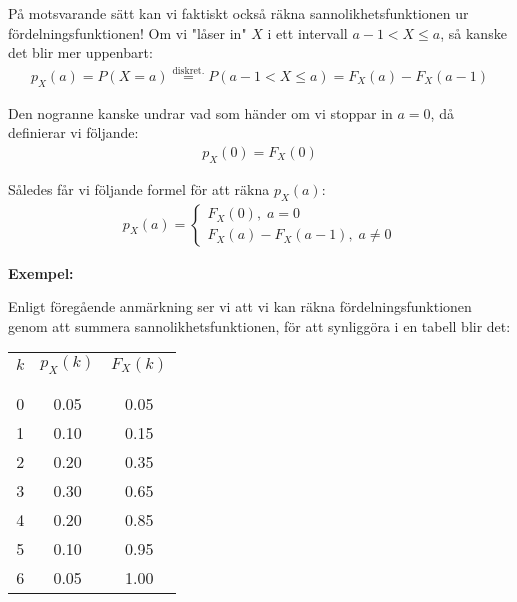 \par\bigskip
\noindent På motsvarande sätt kan vi faktiskt också räkna sannolikhetsfunktionen ur fördelningsfunktionen! Om vi "låser in" $X$ i ett intervall $a-1<X\leq a$, så kanske det blir mer uppenbart:
\begin{equation*}
  \begin{gathered}
    p_X(a) = P(X = a) \stackrel{\text{diskret.}}{=} P(a-1<X\leq a) = F_X(a)-F_X(a-1)
  \end{gathered}
\end{equation*}\par
\noindent Den nogranne kanske undrar vad som händer om vi stoppar in $a = 0$, då definierar vi följande:
\begin{equation*}
  \begin{gathered}
    p_X(0) = F_X(0)
  \end{gathered}
\end{equation*}\par
\noindent Således får vi följande formel för att räkna $p_X(a)$:
\begin{equation*}
  \begin{gathered}
    p_X(a) = \begin{cases}F_X(0),\; a=0\\F_X(a)-F_X(a-1),\; a\neq0\end{cases}
  \end{gathered}
\end{equation*}
\par\bigskip
\noindent\textbf{Exempel:}\par
\noindent Enligt föregående anmärkning ser vi att vi kan räkna fördelningsfunktionen genom att summera sannolikhetsfunktionen, för att synliggöra i en tabell blir det:
\par\bigskip
\begin{center}
  \begin{tabular}{c|c|c}
    $k$&$p_X(k)$&$F_X(k)$\\\\
    \hline\\
    0&0.05&0.05\\
    1&0.10&0.15\\
    2&0.20&0.35\\
    3&0.30&0.65\\
    4&0.20&0.85\\
    5&0.10&0.95\\
    6&0.05&1.00
  \end{tabular}
\end{center}

